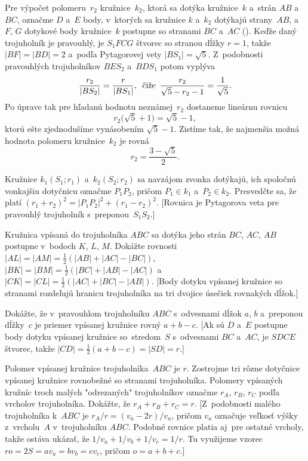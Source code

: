 {Pre výpočet polomeru~$r_2$ kružnice~$k_2$, ktorá sa dotýka kružnice~$k$
a~strán $AB$ a~$BC$, označme $D$ a~$E$ body, v~ktorých sa kružnice $k$ a~$k_2$ dotýkajú strany~$AB$,
a~$F$, $G$ dotykové body kružnice~$k$ postupne so stranami $BC$ a~$AC$ (\obr).
%
Keďže daný trojuholník je pravouhlý, je $S_1FCG$ štvorec so stranou dĺžky $r=1$,
takže $|BF| = |BD| = 2$ a~podľa Pytagorovej vety $|BS_1|=\sqrt{5}$.
Z~podobnosti pravouhlých trojuholníkov $BES_2$ a~$BDS_1$ potom vyplýva
$$
{r_2\over|BS_2|} = {r\over|BS_1|},\quad\text{čiže}\quad
{r_2\over \sqrt{5} - r_2 - 1} = {1\over\sqrt{5}}.
$$
Po úprave tak pre hľadanú hodnotu neznámej~$r_2$ dostaneme lineárnu rovnicu
$$
r_2\bigl(\sqrt5+1\bigr) = \sqrt5-1,
$$
ktorú ešte zjednodušíme vynásobením $\sqrt5-1$. Zistíme tak, že
najmenšia možná hodnota polomeru kružnice~$k_2$ je rovná
$$
r_2 = \frac {3- \sqrt5} 2.
$$


Kružnice $k_1 (S_1; r_1)$ a~$k_2 (S_2; r_2)$ sa navzájom zvonka dotýkajú,
ich spoločnú vonkajšiu dotyčnicu označme $P_1P_2$, pričom $P_1 \in k_1$
a~$P_2 \in k_2$. Presvedčte sa, že platí
$(r_1+r_2)^2 = |P_1P_2|^2+(r_1-r_2)^2$. [Rovnica je Pytagorova veta pre
pravouhlý trojuholník s~preponou~$S_1S_2$.]

Kružnica vpísaná do trojuholníka $ABC$ sa dotýka jeho strán $BC$, $AC$,
$AB$ postupne v~bodoch $K$, $L$, $M$. Dokážte rovnosti
$|AL| = |AM| = \frac12(|AB|+|AC|-|BC|)$, $|BK| = |BM| = \frac12(|BC|+|AB|-|AC|)$
a~$|CK| = |CL| = \frac12(|AC|+|BC|-|AB|)$. [Body dotyku vpísanej kružnice so
stranami rozdeľujú hranicu trojuholníka na tri dvojice úsečiek rovnakých dĺžok.]

\D
Dokážte, že v~pravouhlom trojuholníku $ABC$ s~odvesnami dĺžok $a$, $b$
a~preponou dĺžky~$c$ je priemer vpísanej kružnice rovný $a+b-c$. [Ak sú
$D$ a~$E$ postupne body dotyku vpísanej kružnice so~stredom~$S$
s~odvesnami $BC$ a~$AC$, je $SDCE$ štvorec, takže
$|CD| = \frac12({a+b-c}) = |SD| = r$.]

Polomer vpísanej kružnice trojuholníka~$ABC$ je $r$. Zostrojme tri rôzne
dotyčnice vpísanej kružnice rovnobežné so stranami trojuholníka.
Polomery vpísaných kružníc troch malých "odrezaných" trojuholníkov
označme $r_A$, $r_B$, $r_C$ podľa vrcholov trojuholníka. Dokážte,
že $r_A+r_B+r_C = r$. [Z~podobnosti malého trojuholníka k~$ABC$ je
$r_A/r = (v_a-2r)/v_a$, pričom $v_a$ označuje veľkosť výšky z~vrcholu~$A$
v~trojuholníku $ABC$. Podobné rovnice platia aj~pre ostatné vrcholy,
takže ostáva ukázať, že $1/v_a+1/v_b+1/v_c = 1/r$. Tu využijeme vzorec
$ro = 2S= av_a= bv_b= c v_c$, pričom $o=a+b+c$.]
}

